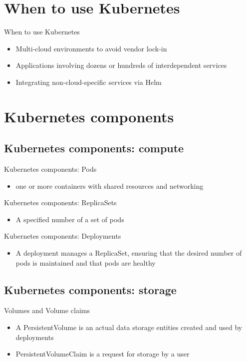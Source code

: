 \documentclass{beamer}
\begin{document}
	\section{When to use Kubernetes}
	\begin{frame}{When to use Kubernetes}
		\begin{itemize}
			\item Multi-cloud environments to avoid vendor lock-in
			\pause
			\item Applications involving dozens or hundreds of interdependent services
			\pause
			\item Integrating non-cloud-specific services via Helm
		\end{itemize}
	\end{frame}
	\section{Kubernetes components}
	\subsection{Kubernetes components: compute}
	\begin{frame}{Kubernetes components: Pods}
		\begin{itemize}
			\item one or more containers with shared resources and networking			
		\end{itemize}
	\end{frame}
	\begin{frame}{Kubernetes components: ReplicaSets}
		\begin{itemize}
			\item A specified number of a set of pods			
		\end{itemize}
	\end{frame}
	\begin{frame}{Kubernetes components: Deployments}
		\begin{itemize}
			\item A deployment manages a ReplicaSet, ensuring that the desired number of pods is maintained and that pods are healthy
		\end{itemize}
	\end{frame}
	\subsection{Kubernetes components: storage}
	\begin{frame}{Volumes and Volume claims}
		\begin{itemize}
			\item A PersistentVolume is an actual data storage entities created and used by deployments
			\pause
			\item PersistentVolumeClaim is a request for storage by a user
		\end{itemize}
	\end{frame}
\end{document}
